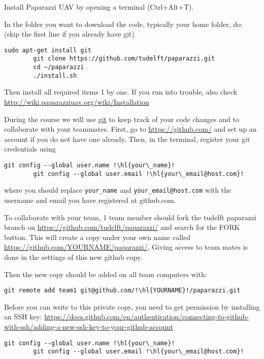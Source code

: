 \begin{enumerate}
	\item{Install Paparazzi UAV by opening a terminal (Ctrl+Alt+T).

	\item In the folder you want to download the code, typically your home folder, do: (skip the first line if you already have git)

	\begin{lstlisting}[style=Bash]
		sudo apt-get install git
		git clone https://github.com/tudelft/paparazzi.git
		cd ~/paparazzi
		./install.sh
	\end{lstlisting}

	Then install all required items 1 by one. If you run into trouble, also check \url{http://wiki.paparazziuav.org/wiki/Installation}
	}
	
	\item{During the course we will use \href{https://git-scm.com/}{git} to keep track of your code changes and to collaborate with your teammates. First, go to \url{https://github.com/} and set up an account if you do not have one already. Then, in the terminal, register your git credentials using
	\begin{lstlisting}[style=Bash]
		git config --global user.name !\hl{your\_name}!
		git config --global user.email !\hl{your\_email@host.com}!
	\end{lstlisting}
	where you should replace \texttt{your\_name} and \texttt{your\_email@host.com} with the username and email you have registered at github.com.}
	
	To collaborate with your team, 1 team member should fork the tudelft paparazzi branch on \url{https://github.com/tudelft/paparazzi/} and search for the FORK button. This will create a copy under your own name called \url{https://github.com/YOURNAME/paparazzi/}. Giving access to team mates is done in the settings of this new github copy.

	Then the new copy should be added on all team computers with:
	\begin{lstlisting}[style=Bash]
		git remote add team1 git@github.com/!\hl{YOURNAME}!/paparazzi.git
	\end{lstlisting}

	Before you can write to this private copy, you need to get permission by installing an SSH key: \url{https://docs.github.com/en/authentication/connecting-to-github-with-ssh/adding-a-new-ssh-key-to-your-github-account}

	\begin{lstlisting}[style=Bash]
		git config --global user.name !\hl{your\_name}!
		git config --global user.email !\hl{your\_email@host.com}!
	\end{lstlisting}



\end{enumerate}
